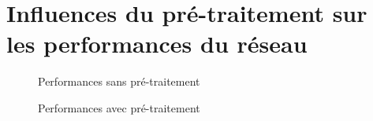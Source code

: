 \documentclass[11pt]{article}
\begin{document}
\section{Influences du pr\'e-traitement sur les performances du r\'eseau}
\begin{figure}[htp]
    \centering
    \caption{Performances sans pr\'e-traitement}
    \caption{Performances avec pr\'e-traitement}
    \label{fig:w_prep}
\end{figure}
\end{document}
